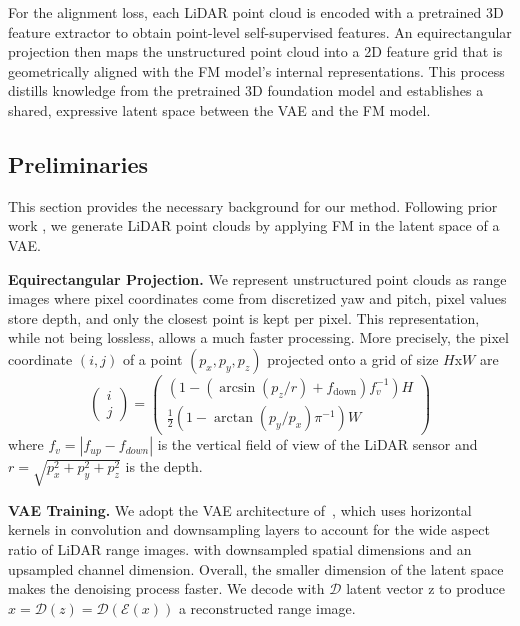 For the alignment loss, each LiDAR point cloud is encoded with a pretrained 3D feature extractor to obtain point-level self-supervised features. An equirectangular projection then maps the unstructured point cloud into a 2D feature grid that is geometrically aligned with the FM model’s internal representations. This process distills knowledge from the pretrained 3D foundation model and establishes a shared, expressive latent space between the VAE and the FM model.

\subsection{Preliminaries}
This section provides the necessary background for our method. Following prior work \cite{rombach_high-resolution_2022,hu_rangeldm_2024,ran_towards_2024}, we generate LiDAR point clouds by applying FM in the latent space of a VAE.

\textbf{Equirectangular Projection.}
We represent unstructured point clouds as range images where pixel coordinates come from discretized yaw and pitch, pixel values store depth, and only the closest point is kept per pixel.
This representation, while not being lossless, allows a much faster processing. 
More precisely, the pixel coordinate  $(i,j)$ of a point $(p_x,p_y,p_z)$  projected onto a grid of size $H$x$W$ are
\begin{equation}
\begin{pmatrix}
i \\
j
\end{pmatrix}
=
\begin{pmatrix}
\left( 1 - \left( \arcsin(p_z/ r) + f_{\text{down}} \right) f_v^{-1} \right) H
\\
\frac{1}{2}\left(1 - \arctan(p_y/p_x) \pi^{-1}\right) W
\end{pmatrix}
\label{eq:proj}
\end{equation}
where $f_v = |f_{up} - f_{down}|$ is the vertical field of view of the LiDAR sensor and $r=\sqrt{p_x^2+p_y^2+p_z^2}$ is the depth.

\textbf{VAE Training.}
We adopt the VAE architecture of~\cite{ran_towards_2024}, which uses horizontal kernels  in convolution and downsampling layers to account for the wide aspect ratio of LiDAR range images.  
 with downsampled spatial dimensions and an upsampled channel dimension. Overall, the smaller dimension of the latent space makes the denoising process faster. 
We decode with $\mathcal{D}$ latent vector z to produce $\hat{x} = \mathcal{D}(z)=\mathcal{D}(\mathcal{E}(x))$ a reconstructed range image.


